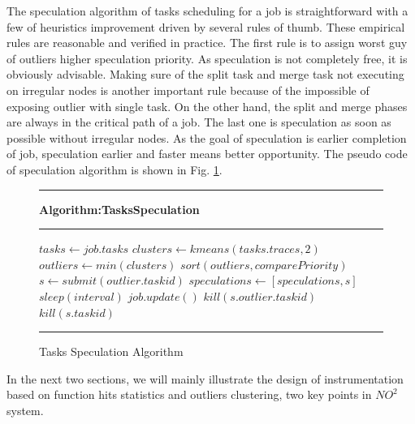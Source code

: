 The speculation algorithm of tasks scheduling for a job is straightforward with a few of heuristics improvement driven by several rules of thumb. These empirical rules are reasonable and verified in practice. The first rule is to assign worst guy of outliers higher speculation priority. As speculation is not completely free, it is obviously advisable. Making sure of the split task and merge task not executing on irregular nodes is another important rule because of the impossible of exposing outlier with single task. On the other hand, the split and merge phases are always in the critical path of a job. The last one is speculation as soon as possible without irregular nodes. As the goal of speculation is earlier completion of job, speculation earlier and faster means better opportunity. The pseudo code of speculation algorithm is shown in Fig. \ref{fig-spec-algo}.

\begin{figure}
\rule[-.2pt]{0.9\columnwidth}{0.9pt}
\textbf{Algorithm:TasksSpeculation}
\rule[-.2pt]{0.9\columnwidth}{0.5pt}

\begin{algorithmic}[1]




    \State $tasks\gets job.tasks$
    \State $clusters\gets kmeans(tasks.traces, 2)$
        \State $outliers\gets min(clusters)$
        \State $sort(outliers, comparePriority)$
            \State $s\gets submit(outlier.taskid)$
            \State $speculations\gets [speculations, s]$
        \EndFor
    \EndIf
    \State $sleep(interval)$
    \State $job.update()$
            \State $kill(s.outlier.taskid)$
            \State $kill(s.taskid)$
        \EndIf
    \EndFor
\EndWhile\label{specendwhile}
\end{algorithmic}
\rule[-.2pt]{0.9\columnwidth}{0.8pt}
\caption{Tasks Speculation Algorithm}\label{fig-spec-algo}
\end{figure}

In the next two sections, we will mainly illustrate the design of instrumentation based on function hits statistics and outliers clustering, two key points in $NO^2$ system. 